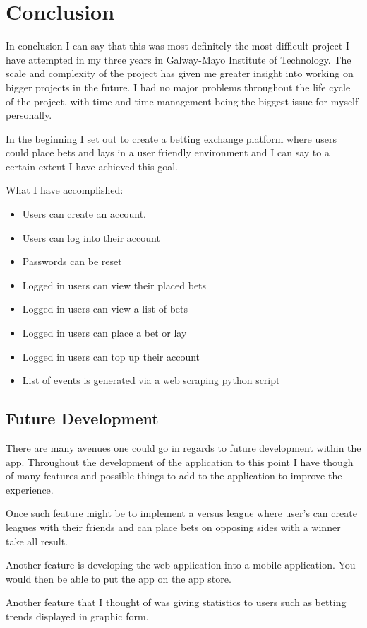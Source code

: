 \chapter{Conclusion}
In conclusion I can say that this was most definitely the most difficult project I have attempted in my three years in Galway-Mayo Institute of Technology. The scale and complexity of the project has given me greater insight into working on bigger projects in the future. I had no major problems throughout the life cycle of the project, with time and time management being the biggest issue for myself personally. 

In the beginning I set out to create a betting exchange platform where users could place bets and lays in a user friendly environment and I can say to a certain extent I have achieved this goal.

What I have accomplished: 
\begin{itemize}

  \item Users can create an account.
  \item Users can log into their account
  \item Passwords can be reset
  \item Logged in users can view their placed bets
  \item Logged in users can view a list of bets
  \item Logged in users can place a bet or lay
  \item Logged in users can top up their account
  \item List of events is generated via a web scraping python script
  
\end{itemize}

\section{Future Development}
There are many avenues one could go in regards to future development within the app. Throughout the development of the application to this point I have though of many features and possible things to add to the application to improve the experience. 

Once such feature might be to implement a versus league where user's can create leagues with their friends and can place bets on opposing sides with a winner take all result.

Another feature is developing the web application into a mobile application. You would then be able to put the app on the app store.

Another feature that I thought of was giving statistics to users such as betting trends displayed in graphic form.


